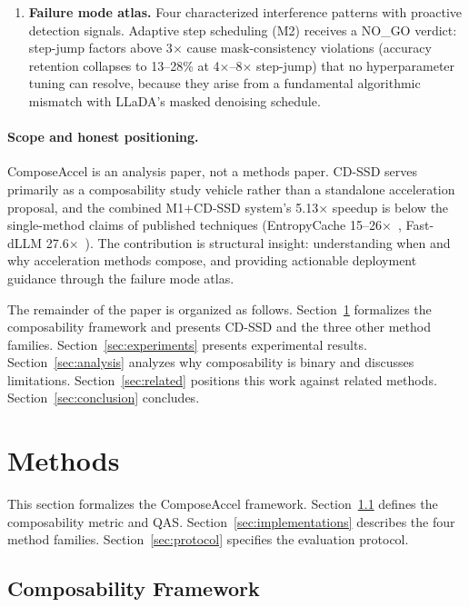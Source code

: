 \documentclass{article}
\begin{document}
\begin{enumerate}
\item \textbf{Failure mode atlas.} Four characterized interference patterns with proactive detection
signals. Adaptive step scheduling (M2) receives a NO\_GO verdict: step-jump factors above 3$\times$
cause mask-consistency violations (accuracy retention collapses to 13--28\% at 4$\times$--8$\times$
step-jump) that no hyperparameter tuning can resolve, because they arise from a fundamental
algorithmic mismatch with LLaDA's masked denoising schedule.
\end{enumerate}

\paragraph{Scope and honest positioning.} ComposeAccel is an analysis paper, not a methods paper.
CD-SSD serves primarily as a composability study vehicle rather than a standalone acceleration
proposal, and the combined M1+CD-SSD system's 5.13$\times$ speedup is below the single-method
claims of published techniques (EntropyCache 15--26$\times$~\cite{entropycache}, Fast-dLLM
27.6$\times$~\cite{fastdllm}). The contribution is structural insight: understanding when and why
acceleration methods compose, and providing actionable deployment guidance through the failure mode
atlas.

The remainder of the paper is organized as follows. Section~\ref{sec:methods} formalizes the
composability framework and presents CD-SSD and the three other method families.
Section~\ref{sec:experiments} presents experimental results. Section~\ref{sec:analysis} analyzes
why composability is binary and discusses limitations. Section~\ref{sec:related} positions this work
against related methods. Section~\ref{sec:conclusion} concludes.

\section{Methods}
\label{sec:methods}

This section formalizes the ComposeAccel framework. Section~\ref{sec:framework} defines the
composability metric and QAS. Section~\ref{sec:implementations} describes the four method families.
Section~\ref{sec:protocol} specifies the evaluation protocol.

\subsection{Composability Framework}
\label{sec:framework}
\end{document}
